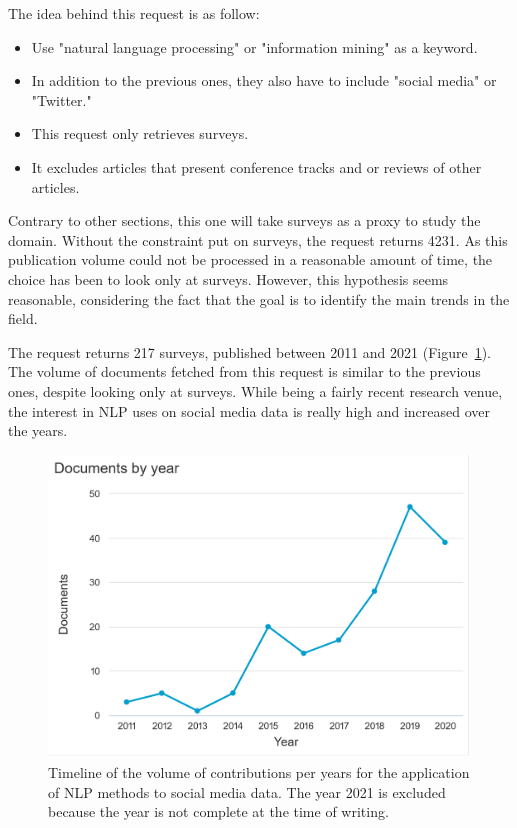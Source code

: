 The idea behind this request is as follow:

\begin{itemize}
    \item Use "natural language processing" or "information mining" as a keyword.
    \item In addition to the previous ones, they also have to include "social media" or "Twitter."
    \item This request only retrieves surveys.
    \item It excludes articles that present conference tracks and or reviews of other articles.
\end{itemize}

Contrary to other sections, this one will take surveys as a proxy to study the domain.
Without the constraint put on surveys, the request returns 4231.
As this publication volume could not be processed in a reasonable amount of time, the choice has been to look only at surveys.
However, this hypothesis seems reasonable, considering the fact that the goal is to identify the main trends in the field.

The request returns 217 surveys, published between 2011 and 2021 (Figure~\ref{literature:nlp-hist}).
The volume of documents fetched from this request is similar to the previous ones, despite looking only at surveys.
While being a fairly recent research venue, the interest in NLP uses on social media data is really high and increased over the years.

\begin{figure}[htb]
    \centering
    \includegraphics[width=\textwidth]{figures/chap-2/nlp-hist.pdf}
    \caption{Timeline of the volume of contributions per years for the application of NLP methods to social media data. The year 2021 is excluded because the year is not complete at the time of writing.}
    \label{literature:nlp-hist}
\end{figure}

